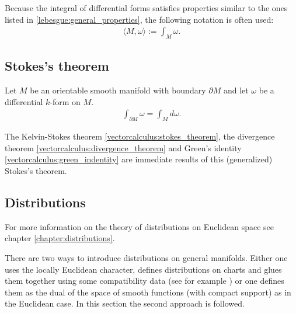 
    \begin{notation}
        Because the integral of differential forms satisfies properties similar to the ones listed in \ref{lebesgue:general_properties}, the following notation is often used:
        \begin{gather}
            \langle M,\omega \rangle := \int_M\omega.
        \end{gather}
    \end{notation}

\subsection{Stokes's theorem}

    \begin{theorem}\label{diff:stokes_theorem}
        Let $M$ be an orientable smooth manifold with boundary $\partial M$ and let $\omega$ be a differential $k$-form on $M$.
        \begin{gather}
            \int_{\partial M}\omega = \int_M d\omega.
        \end{gather}
    \end{theorem}
    \begin{result}
        The Kelvin-Stokes theorem \ref{vectorcalculus:stokes_theorem}, the divergence theorem \ref{vectorcalculus:divergence_theorem} and Green's identity \ref{vectorcalculus:green_indentity} are immediate results of this (generalized) Stokes's theorem.
    \end{result}

\subsection{Distributions}

    For more information on the theory of distributions on Euclidean space see chapter \ref{chapter:distributions}.

    There are two ways to introduce distributions on general manifolds. Either one uses the locally Euclidean character, defines distributions on charts and glues them together using some compatibility data (see for example \cite{AMP1}) or one defines them as the dual of the space of smooth functions (with compact support) as in the Euclidean case. In this section the second approach is followed.

